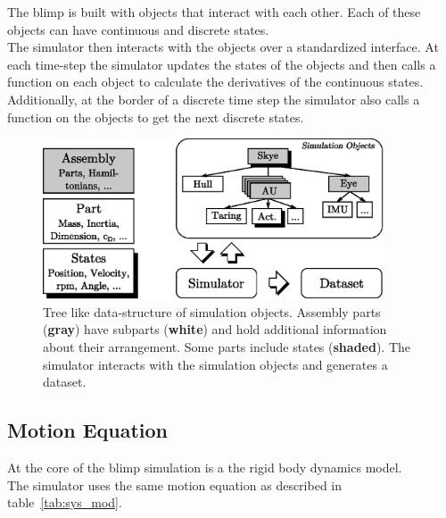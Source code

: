 The blimp is built with objects that interact with each other.
Each of these objects can have continuous and discrete states.\\
The simulator then interacts with the objects over a standardized interface.
At each time-step the simulator updates the states of the objects and then calls a function on each object to calculate the derivatives of the continuous states.
Additionally, at the border of a discrete time step the simulator also calls a function on the objects to get the next discrete states.\\

\begin{figure}[htbp]
\centering
\includegraphics[width=0.9\textwidth]{images/sim/sim_tree.eps}
\caption{Tree like data-structure of simulation objects. Assembly parts (\textbf{gray}) have subparts (\textbf{white}) and hold additional information about their arrangement. Some parts include states (\textbf{shaded}). The simulator interacts with the simulation objects and generates a dataset.}
\label{fig:sim_tree}
\end{figure}

\subsection{Motion Equation}
\label{sub:motion_equation}
At the core of the blimp simulation is a the rigid body dynamics model. \\
The simulator uses the same motion equation as described in table~\ref{tab:sys_mod}.\\

